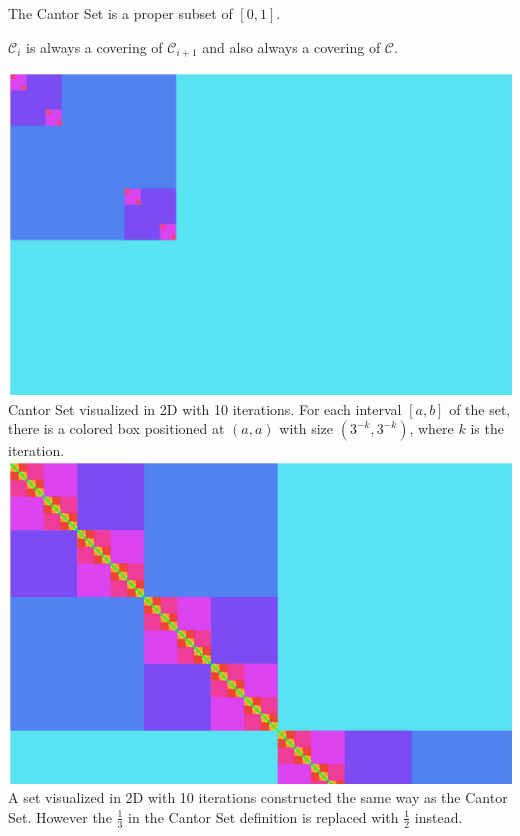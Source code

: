 \documentclass[11pt]{ekblite}
\begin{document}
	\begin{corollary}
		The Cantor Set is a proper subset of $[0,1]$.
	\end{corollary}
	\begin{corollary}
		$\mathcal{C}_{i}$ is always a covering of $\mathcal{C}_{i+1}$ and also always a covering of $\mathcal{C}$.
	\end{corollary}
	\includegraphics[scale=0.2]{img/c1.jpg}
	\\Cantor Set visualized in 2D with 10 iterations. For each interval $[a,b]$ of the set, there is a colored box positioned at $(a,a)$ with size $(3^{-k}, 3^{-k})$, where $k$ is the iteration. 
	\\[0.2in]\includegraphics[scale=0.2]{img/c2.jpg}
	\\A set visualized in 2D with 10 iterations constructed the same way as the Cantor Set. However the $\frac{1}{3}$ in the Cantor Set definition is replaced with $\frac{1}{2}$ instead. 
\end{document}
